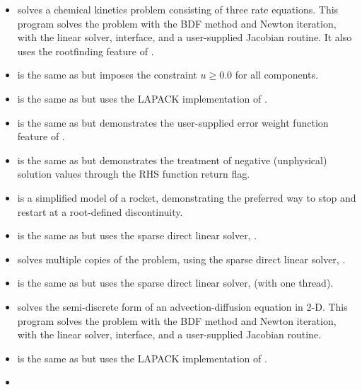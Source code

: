 \begin{itemize}
\item {}
  solves a chemical kinetics problem consisting of three rate equations.
  \newline
  This program solves the problem with the BDF method and Newton
  iteration, with the {\sunlinsoldense} linear solver, {\cvls}
  interface, and a user-supplied Jacobian routine.  It also uses the
  rootfinding feature of {\cvode}.
\item {}
  is the same as  but imposes the constraint
  $u \geq 0.0$ for all components.
\item {}
  is the same as  but uses the LAPACK
  implementation of {\sunlinsollapdense}.
\item {}
  is the same as  but demonstrates the user-supplied error
  weight function feature of {\cvode}.
\item {}
  is the same as  but demonstrates the treatment of
  negative (unphysical) solution values through the RHS function
  return flag.
\item {}
  is a simplified model of a rocket, demonstrating the
  preferred way to stop and restart at a root-defined discontinuity.
\item {}
  is the same as  but uses the {\klu} sparse direct
  linear solver, {\sunlinsolklu}.
\item {}
  solves multiple copies of the  problem, using the
  {\klu} sparse direct linear solver, {\sunlinsolklu}.
\item {}
  is the same as  but uses the {\superlumt} sparse
  direct linear solver, {\sunlinsolslumt} (with one thread).
\item {}
  solves the semi-discrete form of an advection-diffusion equation in 2-D.
  \newline
  This program solves the problem with the BDF method and Newton
  iteration, with the {\sunlinsolband} linear solver, {\cvls}
  interface, and a user-supplied Jacobian routine.
\item {}
  is the same as  but uses the LAPACK
  implementation of {\sunlinsollapband}.
\item {}

\end{itemize}
